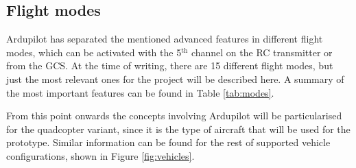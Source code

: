 \subsection{Flight modes}

Ardupilot has separated the mentioned advanced features in different flight modes, which can be activated with the 5$^{\text{th}}$ channel on the RC transmitter or from the GCS.
At the time of writing, there are 15 different flight modes, but just the most relevant ones for the project will be described here.
A summary of the most important features can be found in Table \ref{tab:modes}.

From this point onwards the concepts involving Ardupilot will be particularised for the quadcopter variant, since it is the type of aircraft that will be used for the prototype.
Similar information can be found for the rest of supported vehicle configurations, shown in Figure \ref{fig:vehicles}.

